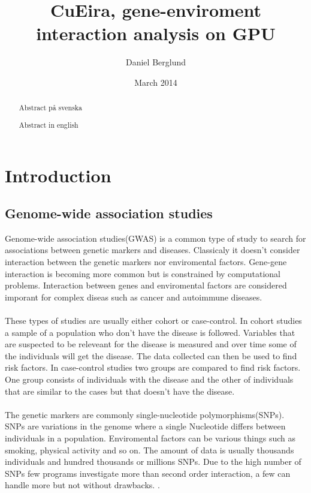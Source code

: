 \documentclass[10pt,a4paper]{article}
\title{CuEira, gene-enviroment interaction analysis on GPU}
\author{Daniel Berglund}
\date{March 2014}
\makeatletter
\newcommand\ackname{Acknowledgements}
\newenvironment{acknowledgements}{
      \titlepage
      \null\vfil
      \@beginparpenalty\@lowpenalty
      \begin{center}%
        \bfseries \ackname
        \@endparpenalty\@M
      \end{center}}%
     {\par\vfil\null\endtitlepage}
\newenvironment{acknowledgements}{
      \if@twocolumn
        \section*{\abstractname}
      \else
        \small
        \begin{center}
          {\bfseries \ackname\vspace{-.5em}\vspace{\z@}}
        \end{center}
        \quotation
      \fi}
      {\if@twocolumn\else\endquotation\fi}
\makeatother
\begin{document}
\maketitle

\clearpage
{}
\begin{abstract}
Abstract på svenska
\end{abstract}
\clearpage
{}
\begin{abstract}
Abstract in english
\end{abstract}
\clearpage
\tableofcontents
\newpage

\section{Introduction}

\subsection{Genome-wide association studies}
Genome-wide association studies(GWAS) is a common type of study to search for associations between genetic markers and diseases. Classicaly it doesn't consider interaction between the genetic markers nor enviromental factors. Gene-gene interaction is becoming more common but is constrained by computational problems. Interaction between genes and enviromental factors are considered imporant for complex diseas such as cancer and autoimmune diseases. \cite{cordell_detect_review, geira, ra_smoking}\\
\\
These types of studies are usually either cohort or case-control. In cohort studies a sample of a population who don't have the disease is followed. Variables that are suspected to be releveant for the disease is measured and over time some of the individuals will get the disease. The data collected can then be used to find risk factors. In case-control studies two groups are compared to find risk factors. One group consists of individuals with the disease and the other of individuals that are similar to the cases but that doesn't have the disease. \cite{mann_observational}\\
\\
The genetic markers are commonly single-nucleotide polymorphisms(SNPs). SNPs are variations in the genome where a single Nucleotide differs between individuals in a population\cite{fareed_snp}. Enviromental factors can be various things such as smoking, physical activity and so on. The amount of data is usually thousands individuals and hundred thousands or millions SNPs. Due to the high number of SNPs few programs investigate more than second order interaction, a few can handle more but not without drawbacks. \cite{gwis,high_order_2012,fast_high_order_cluster}.
\end{document}
